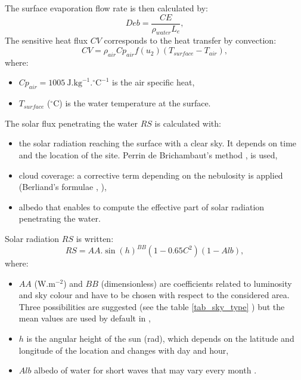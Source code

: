 The surface evaporation flow rate is then calculated by:
\begin{equation}
Deb = \dfrac{CE}{\rho_{water}L_{e}},
\end{equation}
The sensitive heat flux $CV$ corresponds to the heat transfer by convection:
\begin{equation}
CV = \rho_{air}Cp_{air}f(u_{2})(T_{surface}-T_{air}),
\end{equation}
where:
\begin{itemize}
\item $Cp_{air} = 1005~\mathrm{{J}.{kg}^{-1}.^{\circ}{C}^{-1}}$ is the air
specific heat,
\item $T_{surface}$ ($^{\circ}$C) is the water temperature at the surface.
\end{itemize}

The solar flux penetrating the water $RS$ is calculated with:
\begin{itemize}
\item the solar radiation reaching the surface with a clear sky. It depends on
time and the location of the site. Perrin de Brichambaut's method
\cite{perrin63}, \cite{perrin75} is used,
\item cloud coverage: a corrective term depending on the nebulosity is applied
(Berliand's formulae \cite{berliand52}, \cite{berliand60}),
\item albedo that enables to compute the effective part of solar radiation
penetrating the water.
\end{itemize}
Solar radiation $RS$ is written:
\begin{equation}
RS = AA.\sin(h)^{BB}(1-0.65C^{2})(1-Alb),
\end{equation}
where:

\begin{itemize}
\item $AA$ ($\mathrm{{W}.m^{-2}}$) and $BB$ (dimensionless) are coefficients
related to luminosity and sky colour and have to be chosen with respect to the
considered area. Three possibilities are suggested (see the table \ref{tab_sky_type}%
) but the mean values are used by default in ,
\item $h$ is the angular height of the sun (rad), which depends on the latitude and
longitude of the location and changes with day and hour,
\item $Alb$ albedo of water for short waves that may vary every month
\cite{payne}.
\end{itemize}

